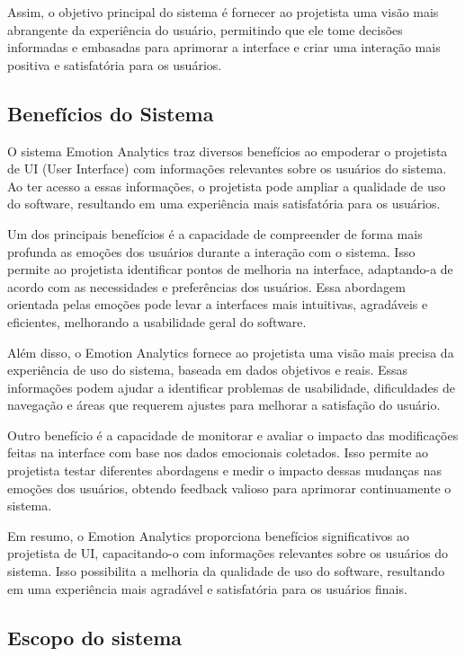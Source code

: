 Assim, o objetivo principal do sistema é fornecer ao projetista uma visão mais abrangente da experiência do usuário, permitindo que ele tome decisões informadas e embasadas para aprimorar a interface e criar uma interação mais positiva e satisfatória para os usuários.

\subsection{Benefícios do Sistema}

O sistema Emotion Analytics traz diversos benefícios ao empoderar o projetista de UI (User Interface) com informações relevantes sobre os usuários do sistema. Ao ter acesso a essas informações, o projetista pode ampliar a qualidade de uso do software, resultando em uma experiência mais satisfatória para os usuários.

Um dos principais benefícios é a capacidade de compreender de forma mais profunda as emoções dos usuários durante a interação com o sistema. Isso permite ao projetista identificar pontos de melhoria na interface, adaptando-a de acordo com as necessidades e preferências dos usuários. Essa abordagem orientada pelas emoções pode levar a interfaces mais intuitivas, agradáveis e eficientes, melhorando a usabilidade geral do software.

Além disso, o Emotion Analytics fornece ao projetista uma visão mais precisa da experiência de uso do sistema, baseada em dados objetivos e reais. Essas informações podem ajudar a identificar problemas de usabilidade, dificuldades de navegação e áreas que requerem ajustes para melhorar a satisfação do usuário.

Outro benefício é a capacidade de monitorar e avaliar o impacto das modificações feitas na interface com base nos dados emocionais coletados. Isso permite ao projetista testar diferentes abordagens e medir o impacto dessas mudanças nas emoções dos usuários, obtendo feedback valioso para aprimorar continuamente o sistema.

Em resumo, o Emotion Analytics proporciona benefícios significativos ao projetista de UI, capacitando-o com informações relevantes sobre os usuários do sistema. Isso possibilita a melhoria da qualidade de uso do software, resultando em uma experiência mais agradável e satisfatória para os usuários finais.

\subsection{Escopo do sistema}

